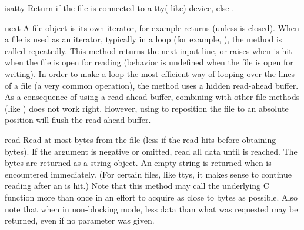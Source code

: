 \begin{methoddesc}[file]{isatty}{}
  Return  if the file is connected to a tty(-like) device, else
  .  
\end{methoddesc}

\begin{methoddesc}[file]{next}{}
A file object is its own iterator, for example  returns
 (unless  is closed).  When a file is used as an
iterator, typically in a  loop (for example,
), the  method is
called repeatedly.  This method returns the next input line, or raises
 when \EOF{} is hit when the file is open for
reading (behavior is undefined when the file is open for writing).  In
order to make a  loop the most efficient way of looping
over the lines of a file (a very common operation), the
 method uses a hidden read-ahead buffer.  As a
consequence of using a read-ahead buffer, combining 
with other file methods (like ) does not work
right.  However, using  to reposition the file to an
absolute position will flush the read-ahead buffer.
\end{methoddesc}

\begin{methoddesc}[file]{read}{}
  Read at most  bytes from the file (less if the read hits
  \EOF{} before obtaining  bytes).  If the 
  argument is negative or omitted, read all data until \EOF{} is
  reached.  The bytes are returned as a string object.  An empty
  string is returned when \EOF{} is encountered immediately.  (For
  certain files, like ttys, it makes sense to continue reading after
  an \EOF{} is hit.)  Note that this method may call the underlying
  C function  more than once in an effort to
  acquire as close to  bytes as possible. Also note that
  when in non-blocking mode, less data than what was requested may
  be returned, even if no  parameter was given.
\end{methoddesc}

